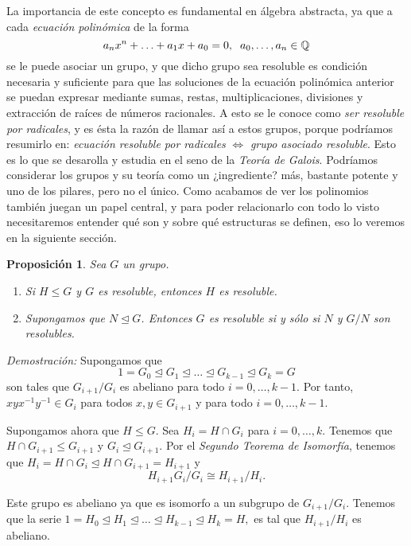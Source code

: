 \documentclass[12pt]{article}
\newtheorem{proposition}[theorem]{Proposición}
\begin{document}
La importancia de este concepto es fundamental en álgebra abstracta, ya que a cada \textit{ecuación polinómica} de la forma $$a_{n}x^{n} + \ldots + a_{1}x + a_{0} = 0, \hspace{0.2cm} a_{0}, \ldots , a_{n} \in \mathbb{Q}$$ se le puede asociar un grupo, y que dicho grupo sea resoluble es condición necesaria y suficiente para que las soluciones de la ecuación polinómica anterior se puedan expresar mediante sumas, restas, multiplicaciones, divisiones y extracción de raíces de números racionales. A esto se le conoce como \textit{ser resoluble por radicales}, y es ésta la razón de llamar así a estos grupos, porque podríamos resumirlo en: \textit{ecuación resoluble por radicales} $\Longleftrightarrow$ \textit{grupo asociado resoluble}. Esto es lo que se desarolla y estudia en el seno de la \textit{Teoría de Galois}. Podríamos considerar los grupos y su teoría como un ¿ingrediente? más, bastante potente y uno de los pilares, pero no el único. Como acabamos de ver los polinomios también juegan un papel central, y para poder relacionarlo con todo lo visto necesitaremos entender qué son y sobre qué estructuras se definen, eso lo veremos en la siguiente sección.

\begin{proposition} \label{eq:reso1} Sea $G$ un grupo.
\begin{enumerate}
\item Si $H \leq G$ y $G$ es resoluble, entonces $H$ es resoluble.
\item Supongamos que $N \unlhd G$. Entonces $G$ es resoluble si y sólo si $N$ y $G/N$ son resolubles.
\end{enumerate}
\end{proposition}
\emph{Demostración: }Supongamos que $$1 = G_0 \unlhd G_1 \unlhd \ldots \unlhd G_{k-1} \unlhd G_k = G$$ son tales que $G_{i+1}/G_i$ es abeliano para todo $i = 0, \ldots, k-1$. Por tanto, $xyx^{-1}y^{-1} \in G_i$ para todos $x,y \in G_{i+1}$ y para todo $i = 0, \ldots, k -1$.

Supongamos ahora que $H \leq G$. Sea $H_i = H \cap G_i$ para $i = 0, \ldots, k$. Tenemos que $H \cap G_{i+1} \leq G_{i+1}$ y $G_i \unlhd G_{i+1}$. Por el \textit{Segundo Teorema de Isomorfía}, tenemos que $H_i = H \cap G_i \unlhd H \cap G_{i+1} = H_{i+1}$ y $$H_{i+1}G_i/G_i \cong H_{i+1}/H_{i}.$$

Este grupo es abeliano ya que es isomorfo a un subgrupo de $G_{i+1}/G_i$. Tenemos que la serie $1 = H_0 \unlhd H_1 \unlhd \ldots \unlhd H_{k-1} \unlhd H_k = H,$ es tal que $H_{i+1}/H_{i}$ es abeliano. 
\end{document}
